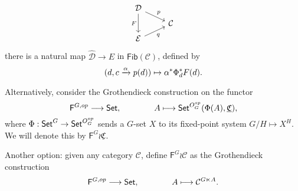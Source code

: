 \documentclass[a4paper,10pt
,draft
]{article}%
\renewcommand{\1}{\ensuremath{\mathbb{id}}}
\renewcommand{\hat}{\widehat}
\begin{document}
\begin{remark}
\begin{equation}
            \begin{tikzcd}[row sep = tiny]
                  \mathcal D \arrow[dr, "p"] \arrow[dd, "F"']
                  \\
                  & \mathcal C
                  \\
                  \mathcal E \arrow[ur, "q"']
            \end{tikzcd}
      \end{equation}
      there is a natural map $\hat{\mathcal D} \to E$ in $\mathsf{Fib}(\mathcal C)$, defined by
      \begin{equation}
            (d, c \xrightarrow{\alpha} p(d)) \mapsto \alpha^{\**} \Phi_d^{\**} F(d).
      \end{equation}
\end{remark}




{\color{blue}
  Alternatively, consider the Grothendieck construction on the functor
  \begin{equation}
        \label{FG_GR_EQ}
        \mathsf F^{G,op} \longrightarrow \mathsf{Set},
        \qquad \qquad
        A \longmapsto \mathsf{Set}^{O_G^{op}}(\Phi(A), \underline{\mathfrak C}),
  \end{equation}
  where $\Phi: \mathsf{Set}^G \to \mathsf{Set}^{O_G^{op}}$ sends a $G$-set $X$ to its fixed-point system $G/H \mapsto X^H$.
  We will denote this by $\mathsf F^G \wr \underline{\mathfrak C}$.
} %

{\color{red}
  Another option:
  given any category $\mathcal C$, define $\mathsf F^G \wr \mathcal C$
  as the Grothendieck construction
  \begin{equation}
        \mathsf F^{G,op} \longrightarrow \mathsf{Set},
        \qquad \qquad
        A \longmapsto \mathcal C^{G \ltimes A}.
  \end{equation}
} %
\end{document}
